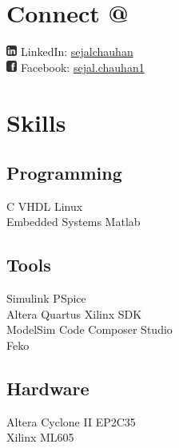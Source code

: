\documentclass[letterpaper]{deedy-resume} %
\begin{document}
\begin{minipage}[t]{0.33\textwidth} %


\section{Connect @}

\includegraphics[height=10pt]{Linkedin-256.png} LinkedIn:  \href{https://www.linkedin.com/in/sejalchauhan}{sejalchauhan} \\
\includegraphics[height=10pt]{Facebook-256.png} Facebook:  \href{https://www.facebook.com/sejal.chauhan1}{sejal.chauhan1} \\

\sectionspace %


\section{Skills}

\subsection{Programming}
C \textbullet{} VHDL \textbullet{} Linux \\
Embedded Systems \textbullet{} Matlab \\
\vspace{\topsep}
\subsection{Tools}
Simulink \textbullet{} PSpice \\
Altera Quartus \textbullet{} Xilinx SDK \\
ModelSim \textbullet{} Code Composer Studio\\
Feko \\
\vspace{\topsep}
\subsection{Hardware}
Altera Cyclone II EP2C35 \\
\textbullet{}Xilinx ML605 \\
\vspace{\topsep}

\end{minipage}
\end{document}
